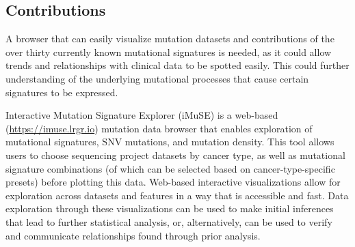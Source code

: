 \documentclass[12pt, letterpaper]{article}
\begin{document}

\subsection{Contributions}
A browser that can easily visualize mutation datasets and contributions of the over thirty currently known mutational signatures is needed, as it could allow trends and relationships with clinical data to be spotted easily.
This could further understanding of the underlying mutational processes that cause certain signatures to be expressed.

Interactive Mutation Signature Explorer (iMuSE) is a web-based (\url{https://imuse.lrgr.io}) mutation data browser that enables exploration of mutational signatures, SNV mutations, and mutation density.
This tool allows users to choose sequencing project datasets by cancer type, as well as mutational signature combinations (of which can be selected based on cancer-type-specific presets) before plotting this data. 
Web-based interactive visualizations allow for exploration across datasets and features in a way that is accessible and fast.
Data exploration through these visualizations can be used to make initial inferences that lead to further statistical analysis, or, alternatively, can be used to verify and communicate relationships found through prior analysis.
\end{document}
